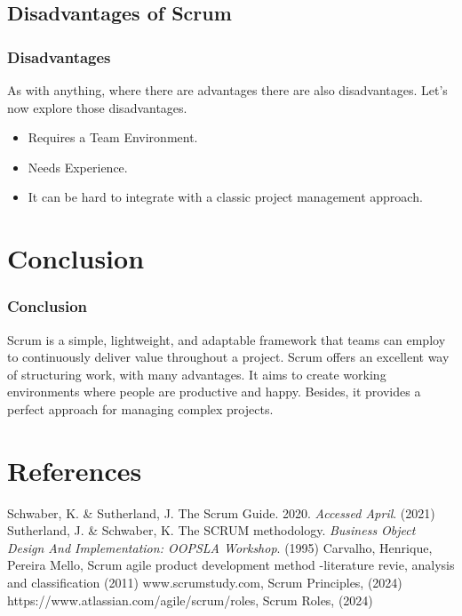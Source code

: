 \documentclass[
	11pt, %
]{beamer}
\begin{document}
\subsection{Disadvantages of Scrum}
\begin{frame}
	\frametitle{Disadvantages}
	As with anything, where there are advantages there are also disadvantages.
	Let's now explore those disadvantages.
	\newline

	\begin{itemize}
		\item Requires a Team Environment.
		\item Needs Experience.
		\item It can be hard to integrate with a classic project management approach.
	\end{itemize}
\end{frame}


\section{Conclusion}

\begin{frame}
	\frametitle{Conclusion}
	Scrum is a simple, lightweight, and adaptable framework that
	teams can employ to continuously deliver value throughout a project.
	Scrum offers an excellent way of structuring work, with many advantages.
	It aims to create working environments where people are productive and happy.
	Besides, it provides a perfect approach for managing complex projects.
\end{frame}

\section{References}

\begin{frame}[allowframebreaks] %
	\begin{thebibliography}{91}
		Schwaber, K. \& Sutherland, J. The Scrum Guide. 2020. {\em Accessed April}. (2021)
		Sutherland, J. \& Schwaber, K. The SCRUM methodology. {\em Business Object Design And Implementation: OOPSLA Workshop}. (1995)
		Carvalho, Henrique, Pereira Mello, Scrum agile product development method -literature revie, analysis and classification (2011)
		 www.scrumstudy.com, Scrum Principles, (2024)
		 https://www.atlassian.com/agile/scrum/roles, Scrum Roles, (2024)
	\end{thebibliography}
\end{frame}
\end{document}
